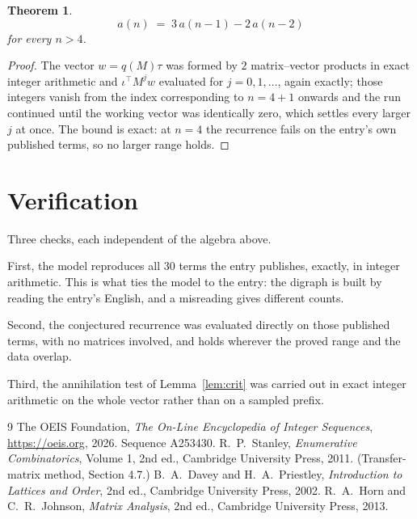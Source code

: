 \documentclass[11pt,a4paper]{article}
\theoremstyle{plain}
\newtheorem{theorem}{Theorem}
\theoremstyle{definition}
\begin{document}
\begin{theorem}
\[
a(n)\;=\;3\,a(n-1) - 2\,a(n-2)
\]
for every $n>4$.
\end{theorem}

\begin{proof}
The vector $w=q(M)\tau$ was formed by $2$ matrix--vector products in exact integer
arithmetic and $\iota^{\!\top}M^{j}w$ evaluated for $j=0,1,\dots$, again exactly; those
integers vanish from the index corresponding to $n=4+1$ onwards and the run continued
until the working vector was identically zero, which settles every larger $j$ at once. The bound is exact: at $n=4$ the recurrence fails on the entry's own published terms, so no larger range holds.
\end{proof}

\section{Verification}

Three checks, each independent of the algebra above.

First, the model reproduces all $30$ terms the entry publishes, exactly, in integer
arithmetic. This is what ties the model to the entry: the digraph is built by reading the
entry's English, and a misreading gives different counts.

Second, the conjectured recurrence was evaluated directly on those published terms, with no
matrices involved, and holds wherever the proved range and the data overlap.

Third, the annihilation test of Lemma~\ref{lem:crit} was carried out in exact integer
arithmetic on the whole vector rather than on a sampled prefix.

\begin{thebibliography}{9}
 The OEIS Foundation, \emph{The On-Line Encyclopedia of Integer
Sequences}, \url{https://oeis.org}, 2026. Sequence A253430.
 R.~P.~Stanley, \emph{Enumerative Combinatorics}, Volume 1, 2nd ed.,
Cambridge University Press, 2011. (Transfer-matrix method, Section 4.7.)
 B.~A.~Davey and H.~A.~Priestley, \emph{Introduction to Lattices and
Order}, 2nd ed., Cambridge University Press, 2002.
 R.~A.~Horn and C.~R.~Johnson, \emph{Matrix Analysis}, 2nd ed., Cambridge
University Press, 2013.
\end{thebibliography}
\end{document}

